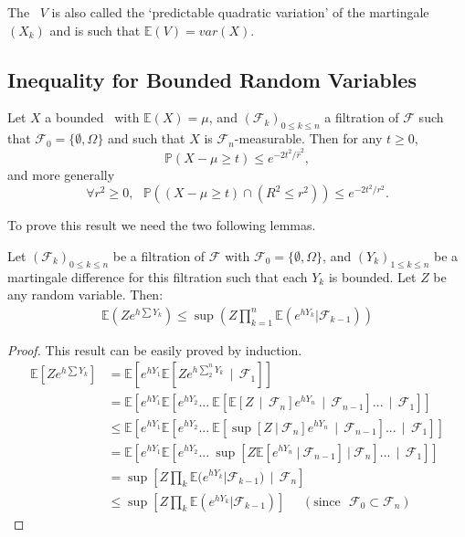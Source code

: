 The \rv~$V$ is also called the `predictable quadratic variation' of the martingale $(X_k)$ and is such that $\mathbb{E}(V)= var(X)$.


\subsection{Inequality for Bounded Random Variables}

\begin{theorem} \citep{McDiarmid98}
\label{3.14}
Let $X$ a bounded \rv~with $\mathbb{E}(X)=\mu$, and $(\mathcal{F}_k)_{0\leq k \leq n}$ a filtration of $\mathcal{F}$ such that $ \mathcal{F}_0 =  \{\emptyset , \Omega\} $ and such that $X$ is $\mathcal{F}_n$-measurable. 
Then for any $t \geq 0$, $$\mathbb{P}(X-\mu \geq t) \leq e^{-2t^2/\hat r^2},$$ and more generally $$\forall r^2 \geq 0,~~~ \mathbb{P}((X-\mu \geq t)\cap(R^2 \leq r^2)) \leq e^{-2t^2/ r^2}.$$
\end{theorem}

To prove this result we need the two following lemmas.


\begin{lemma}
 \label{lemme_mg}
Let $(\mathcal{F}_k)_{0\leq k \leq n}$ be a filtration of $\mathcal{F}$ with $ \mathcal{F}_0 =  \{\emptyset , \Omega\} $, and $(Y_k)_{1 \leq k \leq n}$ be a martingale difference for this filtration such that each $Y_k$ is bounded. Let $Z$ be any random variable. Then:
\begin{align*} \mathbb{E}(Z e^{h\sum Y_k}) \leq \sup(Z \prod_{k=1}^n \mathbb{E}(e^{hY_k}|\mathcal{F}_{k-1} ))
\end{align*}
\end{lemma}
\begin{proof}
This result can be easily proved by induction.
\begin{align*}
\mathbb{E}\left[Z e^{h\sum Y_k}\right] &= \mathbb{E}\left[e^{hY_1}\mathbb{E}\left[ Z e^{h\sum_{2}^n Y_k} ~~|~~ \mathcal{F}_1\right]\right]  \\ &= \mathbb{E}\left[e^{hY_1}\mathbb{E}\left[ e^{hY_2} ...~ \mathbb{E}\left[ \mathbb{E}\left[ Z ~~|~~ \mathcal{F}_n \right] e^{hY_n} ~~|~~ \mathcal{F}_{n-1} \right] ... ~~|~~\mathcal{F}_1 \right] \right]
\\ &\le \mathbb{E}\left[e^{hY_1}\mathbb{E}\left[ e^{hY_2} ...~ \mathbb{E}\left[ \sup\left[ Z ~|~ \mathcal{F}_n \right] e^{hY_n} ~~|~~ \mathcal{F}_{n-1} \right] ... ~~|~~\mathcal{F}_1 \right] \right]
\\ &= \mathbb{E}\left[e^{hY_1}\mathbb{E}\left[ e^{hY_2} ...~  \sup\left[ Z\mathbb{E}\left[e^{hY_n} ~|~ \mathcal{F}_{n-1} \right] ~|~ \mathcal{F}_n \right]  ... ~~|~~\mathcal{F}_1 \right] \right]
\\ &= \sup\left[Z \prod_{k} \mathbb{E}(e^{hY_k}|\mathcal{F}_{k-1} )~~|~~ \mathcal{F}_n\right]
\\ &\le \sup\left[Z \prod_{k} \mathbb{E}(e^{hY_k}|\mathcal{F}_{k-1} )\right]~~~~~~(\text{since~~} \mathcal{F}_0 \subset \mathcal{F}_n)
\end{align*}
\end{proof}

